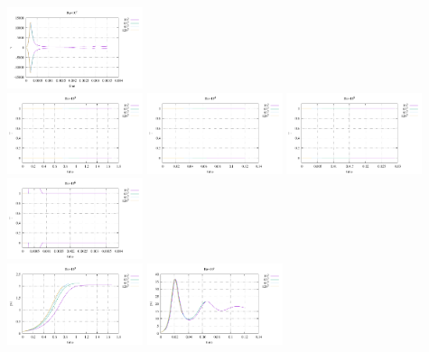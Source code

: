 \begin{center}
\includegraphics[width=3.97cm]{python_codes/fieldstone_155/results/stats_v_Ra1e6}\\
\includegraphics[width=3.97cm]{python_codes/fieldstone_155/results/stats_T_Ra1e3}
\includegraphics[width=3.97cm]{python_codes/fieldstone_155/results/stats_T_Ra1e4}
\includegraphics[width=3.97cm]{python_codes/fieldstone_155/results/stats_T_Ra1e5}
\includegraphics[width=3.97cm]{python_codes/fieldstone_155/results/stats_T_Ra1e6}\\
\includegraphics[width=3.97cm]{python_codes/fieldstone_155/results/stats_psi_Ra1e3}
\includegraphics[width=3.97cm]{python_codes/fieldstone_155/results/stats_psi_Ra1e4}

\end{center}
